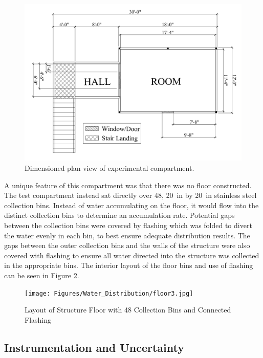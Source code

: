 \documentclass[12pt,oneside]{book}
\begin{document}
\begin{figure}[!ht]
	\centering
	\includegraphics[width=\columnwidth]{Figures/Water_Distribution/ADDtopdownviewtext}
	\caption[Dimensioned Plan View of Experimental Compartment]{Dimensioned plan view of experimental compartment.}
	\label{fig:ADD_Top_View}
\end{figure}

\clearpage

A unique feature of this compartment was that there was no floor constructed. The test compartment instead sat directly over 48, 20~in by 20~in stainless steel collection bins. Instead of water accumulating on the floor, it would flow into the distinct collection bins to determine an accumulation rate. Potential gaps between the collection bins were covered by flashing which was folded to divert the water evenly in each bin, to best ensure adequate distribution results. The gaps between the outer collection bins and the walls of the structure were also covered with flashing to ensure all water directed into the structure was collected in the appropriate bins. The interior layout of the floor bins and use of flashing can be seen in Figure \ref{fig:ADD_Flashing}. 

\begin{figure}[!ht]
	\centering
	\texttt{[image: Figures/Water\_Distribution/floor3.jpg]}
	\caption{Layout of Structure Floor with 48 Collection Bins and Connected Flashing}
	\label{fig:ADD_Flashing}
\end{figure}

\subsection{Instrumentation and Uncertainty}
\label{sec:add_instrumentation}
\end{document}
